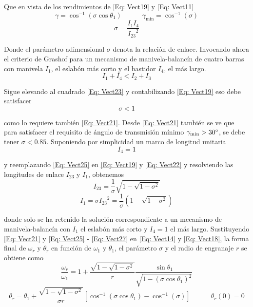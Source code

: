 \documentclass[12pt, final]{extarticle}
\begin{document}
Que en vista de los rendimientos de \eqref{Eq: Vect19} y \eqref{Eq: Vect11} 
\begin{equation}
    \gamma=\cos^{-1}{(\sigma\cos{\theta_1})}   \quad\quad\quad \gamma_{\text{min}}=\cos^{-1}{(\sigma)} 
   \label{Eq: Vect21} 
\end{equation}
\begin{equation}
    \sigma=\frac{I_1 I_4}{{I_{23}}^2}
   \label{Eq: Vect22} 
\end{equation}

Donde el parámetro adimensional $\sigma$ denota la relación de enlace. Invocando ahora el criterio de Grashof para un mecanismo de manivela-balancín de cuatro barras con manivela $I_1$, el eslabón más corto y el bastidor $I_4$, el más largo.
\begin{equation}
    I_1+I_4 < I_2+I_3
   \label{Eq: Vect23} 
\end{equation}

Sigue elevando al cuadrado \eqref{Eq: Vect23} y contabilizando \eqref{Eq: Vect19} eso debe satisfacer
\begin{equation}
    \sigma < 1
   \label{Eq: Vect24} 
\end{equation}

como lo requiere también \eqref{Eq: Vect21}. Desde \eqref{Eq: Vect21} también se ve que para satisfacer el requisito de ángulo de transmisión mínimo $\gamma_{\text{min}}>30\degree$, se debe tener $\sigma<0.85$. Suponiendo por simplicidad un marco de longitud unitaria
\begin{equation}
    I_4=1
   \label{Eq: Vect25} 
\end{equation}

y reemplazando \eqref{Eq: Vect25} en \eqref{Eq: Vect19} y \eqref{Eq: Vect22} y resolviendo las longitudes de enlace $I_{23}$ y $I_1$, obtenemos
\begin{equation}
    I_{23}=\frac{1}{\sigma}\sqrt{1-\sqrt{1-{\sigma}^2}}
   \label{Eq: Vect26} 
\end{equation}
\begin{equation}
    I_1=\sigma{I_{23}}^2=\frac{1}{\sigma}(1-\sqrt{1-{\sigma}^2})
   \label{Eq: Vect27} 
\end{equation}

donde solo se ha retenido la solución correspondiente a un mecanismo de manivela-balancín con $I_1$ el eslabón más corto y $I_4=1$ el más largo. Sustituyendo \eqref{Eq: Vect21} y \eqref{Eq: Vect25} - \eqref{Eq: Vect27} en \eqref{Eq: Vect14} y \eqref{Eq: Vect18}, la forma final de $\omega_r$ y $\theta_r$ en función de $\omega_1$ y $\theta_1$, el parámetro $\sigma$ y el radio de engranaje $r$ se obtiene como
\begin{equation}
   \frac{\omega_r}{\omega_1}=1+\frac{\sqrt{1-\sqrt{1-{\sigma}^2}}}{r}\frac{\sin{\theta_1}}{\sqrt{1-{(\sigma\cos{\theta_1})}^2}}
   \label{Eq: Vect28} 
\end{equation}
\begin{equation}
   \theta_r=\theta_1+\frac{\sqrt{1-\sqrt{1-{\sigma}^2}}}{\sigma r}[\cos^{-1}{(\sigma\cos{\theta_1})}-\cos^{-1}{(\sigma)}] \quad\quad\quad \theta_r(0)=0
   \label{Eq: Vect29} 
\end{equation}
\end{document}
